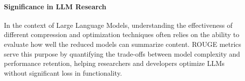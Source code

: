     \paragraph{Significance in LLM Research}
    In the context of Large Language Models, understanding the effectiveness of different compression and optimization techniques often relies on the ability to evaluate how well the reduced models can summarize content. ROUGE metrics serve this purpose by quantifying the trade-offs between model complexity and performance retention, helping researchers and developers optimize LLMs without significant loss in functionality.
